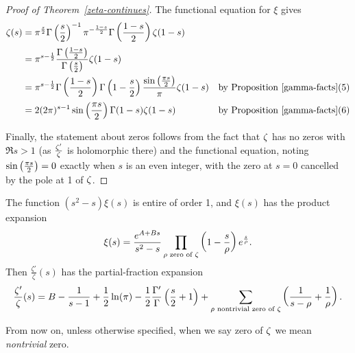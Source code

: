\begin{proof}[Proof of Theorem~\ref{zeta-continues}]
The functional equation for $\xi$ gives
\begin{align*}
\zeta(s)&=\pi^{\frac{s}{2}} \Gamma\left( {\frac{s}{2}} \right)^{-1}\pi^{-\frac{1-s}{2}} \Gamma\left( {\frac{1-s}{2}} \right)\zeta(1-s)\\
&=\pi^{s-\frac{1}{2}} \frac{\Gamma\left( {\frac{1-s}{2}} \right)}{\Gamma\left( {\frac{s}{2}} \right)}\zeta(1-s)\\
&=\pi^{s-\frac{1}{2}}\Gamma\left( {\frac{1-s}{2}} \right) \Gamma\left( {1-\frac{s}{2}} \right) \frac{\sin\left( {\frac{\pi s}{2}} \right)}{\pi}\zeta(1-s)&\text{by Proposition~\ref{gamma-facts}(5)}\\
&=2(2\pi)^{s-1}\sin\left( {\frac{\pi s}{2}} \right)\Gamma(1-s)\zeta(1-s)&\text{by Proposition~\ref{gamma-facts}(6)}
\end{align*}

Finally, the statement about zeros follows from the fact that $\zeta$ has no zeros with $\Re s>1$ (as $\frac{\zeta'}{\zeta}$ is holomorphic there) and the functional equation, noting $\sin\left( {\frac{\pi s}{2}} \right)=0$ exactly when $s$ is an even integer, with the zero at $s=0$ cancelled by the pole at 1 of $\zeta$.
\end{proof}
\begin{thm}
The function $(s^2-s)\xi(s)$ is entire of order 1, and $\xi(s)$ has the product expansion
\[
\xi(s)=\frac{e^{A+Bs}}{s^2-s}\prod_{\rho\text{ zero of }\zeta} \left( {1-\frac s{\rho}} \right)e^{\frac s{\rho}}.
\]
Then $\frac{\zeta'}{\zeta}(s)$ has the partial-fraction expansion
\[
\frac{\zeta'}{\zeta}(s)=B-\frac{1}{s-1}+\frac{1}{2}\ln(\pi) -\frac{1}{2}\frac{\Gamma'}{\Gamma}\left( {\frac s2+1} \right)+\sum_{\rho\text{ nontrivial zero of }\zeta}\left( {\frac{1}{s-\rho}+\frac{1}{\rho}} \right).
\]
\end{thm}
From now on, unless otherwise specified, when we say zero of $\zeta$ we mean {\it nontrivial} zero.
